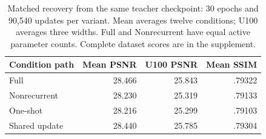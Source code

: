 \begin{table}[!t]
\caption{Matched recovery from the same teacher checkpoint: 30 epochs and 90,540 updates per variant. Mean averages twelve conditions; U100 averages three widths. Full and Nonrecurrent have equal active parameter counts. Complete dataset scores are in the supplement.}
\label{tab:shared_recovery}
\centering\scriptsize
\setlength{\tabcolsep}{3pt}
\begin{tabular}{lrrr}
\toprule
Condition path & Mean PSNR & U100 PSNR & Mean SSIM\\
\midrule
Full & 28.466 & 25.843 & .79322\\
Nonrecurrent & 28.230 & 25.319 & .79133\\
One-shot & 28.216 & 25.299 & .79103\\
Shared update & 28.440 & 25.785 & .79304\\
\bottomrule
\end{tabular}
\end{table}

